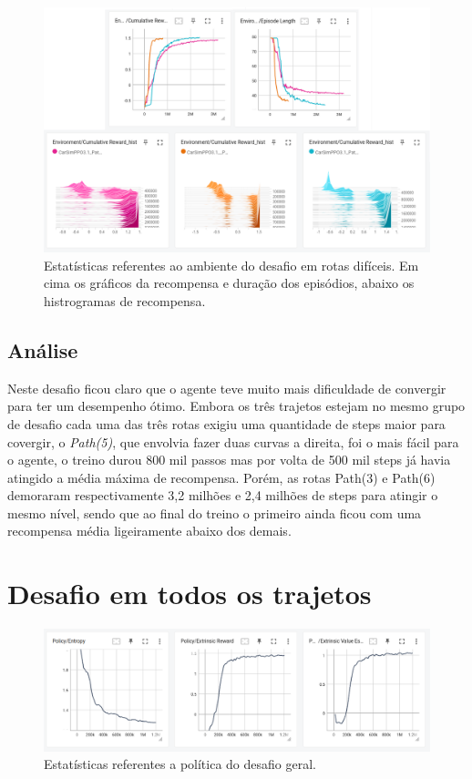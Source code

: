 \begin{figure}[h]
    \centering
    \includegraphics[scale=1.25]{figs/treinos/desafio-dificil/ambiente-completo.png}
    \caption{Estatísticas referentes ao ambiente do desafio em rotas difíceis. Em cima os gráficos da recompensa e duração dos episódios, abaixo os histrogramas de recompensa.}
\end{figure}

\subsection*{Análise}
Neste desafio ficou claro que o agente teve muito mais dificuldade de convergir para ter um desempenho ótimo. Embora os três trajetos estejam no mesmo grupo de desafio cada uma das três rotas exigiu uma quantidade de steps maior para covergir, o \textit{Path(5)}, que envolvia fazer duas curvas a direita, foi o mais fácil para o agente, o treino durou 800 mil passos mas por volta de 500 mil steps já havia atingido a média máxima de recompensa. Porém, as rotas Path(3) e Path(6) demoraram respectivamente 3,2 milhões e 2,4 milhões de steps para atingir o mesmo nível, sendo que ao final do treino o primeiro ainda ficou com uma recompensa média ligeiramente abaixo dos demais.
\section{Desafio em todos os trajetos}

\begin{figure}[h]
    \centering
    \includegraphics[scale=0.35]{figs/treinos/desafio-geral/politica.png}
    \caption{Estatísticas referentes a política do desafio geral.}
\end{figure}

